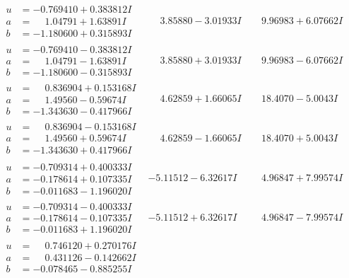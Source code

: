\documentclass[1p]{elsarticle_modified}
\theoremstyle{definition}
\begin{document}
$$\begin{array}{c|c|c}
\begin{aligned}
u &= -0.769410 + 0.383812 I \\
a &= \phantom{-}1.04791 + 1.63891 I \\
b &= -1.180600 + 0.315893 I\end{aligned}
 & \phantom{-}3.85880 - 3.01933 I & \phantom{-}9.96983 + 6.07662 I \\ \hline\begin{aligned}
u &= -0.769410 - 0.383812 I \\
a &= \phantom{-}1.04791 - 1.63891 I \\
b &= -1.180600 - 0.315893 I\end{aligned}
 & \phantom{-}3.85880 + 3.01933 I & \phantom{-}9.96983 - 6.07662 I \\ \hline\begin{aligned}
u &= \phantom{-}0.836904 + 0.153168 I \\
a &= \phantom{-}1.49560 - 0.59674 I \\
b &= -1.343630 - 0.417966 I\end{aligned}
 & \phantom{-}4.62859 + 1.66065 I & \phantom{-}18.4070 - 5.0043 I \\ \hline\begin{aligned}
u &= \phantom{-}0.836904 - 0.153168 I \\
a &= \phantom{-}1.49560 + 0.59674 I \\
b &= -1.343630 + 0.417966 I\end{aligned}
 & \phantom{-}4.62859 - 1.66065 I & \phantom{-}18.4070 + 5.0043 I \\ \hline\begin{aligned}
u &= -0.709314 + 0.400333 I \\
a &= -0.178614 + 0.107335 I \\
b &= -0.011683 - 1.196020 I\end{aligned}
 & -5.11512 - 6.32617 I & \phantom{-}4.96847 + 7.99574 I \\ \hline\begin{aligned}
u &= -0.709314 - 0.400333 I \\
a &= -0.178614 - 0.107335 I \\
b &= -0.011683 + 1.196020 I\end{aligned}
 & -5.11512 + 6.32617 I & \phantom{-}4.96847 - 7.99574 I \\ \hline\begin{aligned}
u &= \phantom{-}0.746120 + 0.270176 I \\
a &= \phantom{-}0.431126 - 0.142662 I \\
b &= -0.078465 - 0.885255 I\end{aligned}

\end{array}$$
\end{document}
